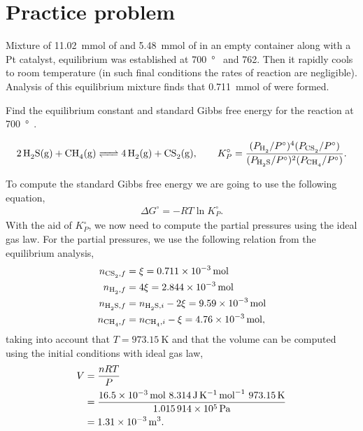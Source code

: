 \documentclass[main.tex]{subfiles}
\begin{document}
\section{Practice problem}

Mixture of \SI{11.02}{\milli\mol} of  and \SI{5.48}{\milli\mol} of  in an empty container along with a Pt catalyst, equilibrium was established at \SI{700}{\degree\celcius} and \SI{762}{\torr}.
Then it rapidly cools to room temperature (in such final conditions the rates of reaction are negligible).
Analysis of this equilibrium mixture finds that \SI{0.711}{\milli\mol} of  were formed.

Find the equilibrium constant and standard Gibbs free energy for the reaction at \SI{700}{\degree\celcius}.

\begin{gather*}
    \ce{2H2S(g) + CH4(g) <=> 4H2(g) + CS2(g)},
    \qquad K^\circ_P=\frac{(P_{\ce{H2}}/P^\circ)^4(P_{\ce{CS2}}/P^\circ)}{(P_{\ce{H2S}}/P^\circ)^2(P_{\ce{CH4}}/P^\circ)}.
\end{gather*}

To compute the standard Gibbs free energy we are going to use the following equation,
\begin{gather*}
    \Delta G^\circ=-RT\ln K^\circ_P.
\end{gather*}
With the aid of $K^\circ_P$, we now need to compute the partial pressures using the ideal gas law.
For the partial pressures, we use the following relation from the equilibrium analysis,
\begin{align*}
    n_{\ce{CS2},f} &= \xi = \SI{0.711d-3}{\mol}\\
    n_{\ce{H2},f} &= 4\xi = \SI{2.844d-3}{\mol}\\
    n_{\ce{H2S},f} &= n_{\ce{H2S},i}-2\xi = \SI{9.59d-3}{\mol} \\
    n_{\ce{CH4},f} &= n_{\ce{CH4},i}-\xi = \SI{4.76d-3}{\mol},
\end{align*}
taking into account that $T=\SI{973.15}{\kelvin}$ and that the volume can be computed using the initial conditions with ideal gas law,
\begin{align*}
    V &= \frac{nRT}{P} \\
      &= \frac{\SI{16.5d-3}{\mol}~\SI{8.314}{\joule\per\kelvin\per\mol}~\SI{973.15}{\kelvin}}{\SI{1.015914d5}{\pascal}} \\
      &= \SI{1.31d-3}{\meter\tothe{3}}.
\end{align*}
\end{document}
